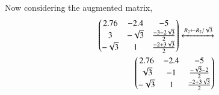 \documentclass[journal,12pt,twocolumn]{IEEEtran}
\renewcommand\thesection{\arabic{section}}
\begin{document}
Now considering the augmented matrix,
\begin{align}
\begin{pmatrix}2.76 & -2.4 & -5\\3 & -\sqrt{3} & \frac{-3 - 2\sqrt{3}}{2}\\-\sqrt{3} & 1 & \frac{-2 +3\sqrt{3}}{2} \end{pmatrix}\xleftrightarrow[]{R_2\leftarrow R_2/\sqrt{3}}\\
\begin{pmatrix}2.76 & -2.4 & -5\\\sqrt{3} & -1 & \frac{-\sqrt{3} - 2}{2}\\-\sqrt{3} & 1 & \frac{-2 +3\sqrt{3}}{2} \end{pmatrix}\\
\end{align}

\end{document}
